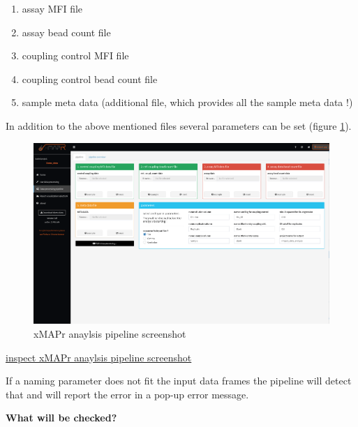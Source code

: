 \documentclass[
]{book}
\providecommand{\tightlist}{%
  \setlength{\itemsep}{0pt}\setlength{\parskip}{0pt}}
\begin{document}
\begin{enumerate}
\def\labelenumi{\arabic{enumi}.}
\tightlist
\item
  assay MFI file
\item
  assay bead count file
\item
  coupling control MFI file
\item
  coupling control bead count file
\item
  sample meta data (additional file, which provides all the sample meta data !)
\end{enumerate}

In addition to the above mentioned files several parameters can be set (figure \ref{fig:xMAPrPipeline}).

\begin{figure}

{\centering \includegraphics[width=50.92in]{figures/pipeline} 

}

\caption{xMAPr anaylsis pipeline screenshot}\label{fig:xMAPrPipeline}
\end{figure}

\href{figures/pipeline.png}{inspect xMAPr anaylsis pipeline screenshot}

If a naming parameter does not fit the input data frames the pipeline will detect that and will report the error in a pop-up error message.

\textbf{What will be checked?}
\end{document}
